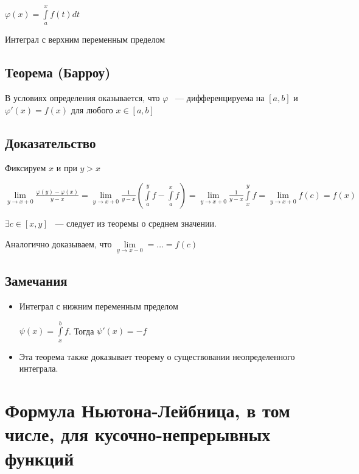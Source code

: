 \documentclass{article}
\begin{document}
			$\varphi (x) = \int\limits^x_a f(t)dt$
		
			Интеграл с верхним переменным пределом
		
		\subsection{Теорема (Барроу)}
		
			В условиях определения оказывается, что $\varphi$ ~--- дифференцируема на $[a, b]$ и $\varphi'(x) = f(x)$ для любого $x \in [a, b]$
		
		\subsection{Доказательство}
		
			Фиксируем $x$ и при $y > x$
		
			$\lim\limits_{y \rightarrow x + 0} \frac{\varphi(y) - \varphi(x)}{y - x} = \lim\limits_{y \rightarrow x + 0} \frac{1}{y - x} \left( \int\limits^y_a f - \int\limits^x_a f \right) = \lim\limits_{y \rightarrow x + 0} \frac{1}{y - x} \int\limits^y_x f = \lim\limits_{y \rightarrow x + 0} f(c) = f(x)$
		
			$\exists c \in [x, y]$ ~--- следует из теоремы о среднем значении.
		
			Аналогично доказываем, что $\lim\limits_{y \rightarrow x - 0} = \ldots = f(c)$
		
		\subsection{Замечания}
		
			\begin{itemize}
			
				\item Интеграл с нижним переменным пределом
				
					$\psi(x) = \int\limits^b_x f$. Тогда $\psi'(x) = -f$
					
				\item Эта теорема также доказывает теорему о существовании неопределенного интеграла.
				
			\end{itemize}
			
	\newpage
	
	\section{Формула Ньютона-Лейбница, в том числе, для кусочно-непрерывных функций}
	
\end{document}

